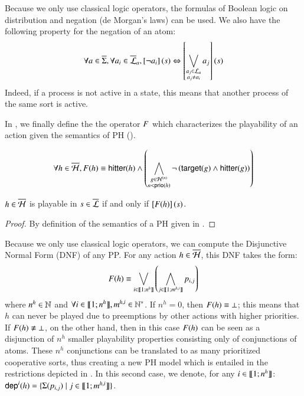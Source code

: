 Because we only use classical logic operators, the formulas of Boolean logic on distribution and negation (de Morgan's laws) can be used.
We also have the following property for the negation of an atom:
\[\forall a \in \overline{\Sigma}, \forall a_i \in \overline{\mathcal{L}}_a, \left[\neg a_i\right](s)
  \Leftrightarrow \left[\bigvee_{\substack{a_j \in \mathcal{L}_a\\a_j \neq a_i}} a_j\right](s)\]
Indeed, if a process is not active in a state, this means that another process of the same sort is active.

In , we finally define the the operator $F$ which characterizes the playability of an action
given the semantics of PH ().
\begin{definition}\label{def:fop}
  $$\forall h \in \overline{\mathcal{H}}, F(h) \equiv \mathsf{hitter}(h) \wedge
    \left( \bigwedge_{\substack{g \in \mathcal{H}^{(n)}\\n < \mathsf{prio}(h)}}
    \neg \left( \mathsf{target}(g) \wedge \mathsf{hitter}(g)\right) \right)$$
\end{definition}
%
\begin{theorem}
\label{th:ppplay}
  $h \in \overline{\mathcal{H}}$ is playable in $s \in \overline{\mathcal{L}}$ if and only if $\left[F(h)\right](s)$.
\end{theorem}
%
\begin{proof}
  By definition of the semantics of a PH given in .
\end{proof}

\newcommand{\n}[1][h]{n^{#1}}
\newcommand{\m}[1][h,i]{m^{#1}}

Because we only use classical logic operators, we can compute the Disjunctive Normal Form (DNF) of any PP.
For any action $h \in \overline{\mathcal{H}}$, this DNF takes the form:
\[\Fop{h} \equiv \bigvee_{i \in \segm{1}{\n}} \left( \bigwedge_{j \in \segm{1}{\m}} p_{i,j} \right)\]
where $\n \in \sN$ and $\forall i \in \segm{1}{\n}, \m \in \sN^*$.
If $\n = 0$, then $F(h) \equiv \bot$; this means that $h$ can never be played
due to preemptions by other actions with higher priorities.
If $F(h) \not\equiv \bot$, on the other hand, then in this case $F(h)$
can be seen as a disjunction of $\n$ smaller playability properties consisting only of conjunctions of atoms.
These $\n$ conjunctions can be translated to as many prioritized cooperative sorts,
thus creating a new PH model which is entailed in the restrictions depicted in .
In this second case, we denote, for any $i \in \segm{1}{\n}$:
$\PHdep{i}{h} = \{ \PHsort(p_{i,j}) \mid j \in \segm{1}{\m} \}$.

